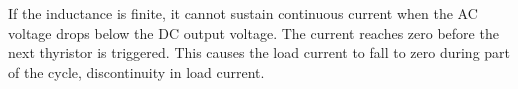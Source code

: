 

\begin{solutionblock}
If the inductance is finite, it cannot sustain continuous current when the AC voltage drops below the DC output voltage. 
The current reaches zero before the next thyristor is triggered. This causes the load current to fall to zero during part of
the cycle, discontinuity in load current.
\end{solutionblock}